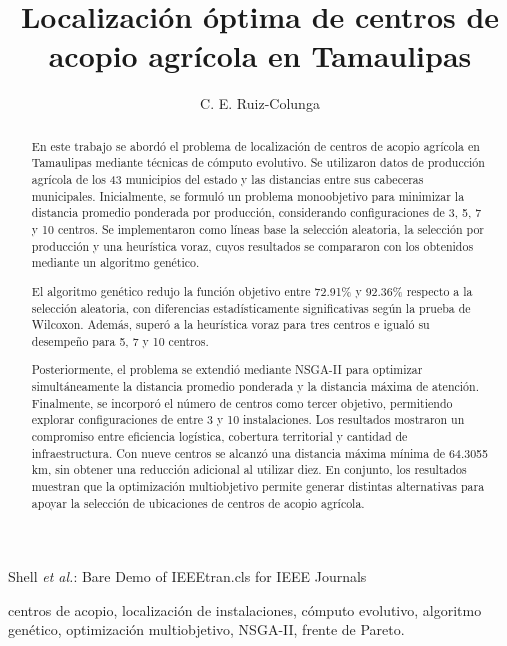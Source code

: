 \documentclass[journal]{IEEEtran}
\begin{document}
\title{Localización óptima de centros de acopio agrícola en Tamaulipas}

\author{C. E. Ruiz-Colunga}


%
{Shell \MakeLowercase{\textit{et al.}}: Bare Demo of IEEEtran.cls for IEEE Journals}

\maketitle

\begin{abstract}
En este trabajo se abordó el problema de localización de centros de acopio agrícola en Tamaulipas mediante técnicas de cómputo evolutivo. Se utilizaron datos de producción agrícola de los 43 municipios del estado y las distancias entre sus cabeceras municipales. Inicialmente, se formuló un problema monoobjetivo para minimizar la distancia promedio ponderada por producción, considerando configuraciones de 3, 5, 7 y 10 centros. Se implementaron como líneas base la selección aleatoria, la selección por producción y una heurística voraz, cuyos resultados se compararon con los obtenidos mediante un algoritmo genético.

El algoritmo genético redujo la función objetivo entre 72.91\% y 92.36\% respecto a la selección aleatoria, con diferencias estadísticamente significativas según la prueba de Wilcoxon. Además, superó a la heurística voraz para tres centros e igualó su desempeño para 5, 7 y 10 centros.

Posteriormente, el problema se extendió mediante NSGA-II para optimizar simultáneamente la distancia promedio ponderada y la distancia máxima de atención. Finalmente, se incorporó el número de centros como tercer objetivo, permitiendo explorar configuraciones de entre 3 y 10 instalaciones. Los resultados mostraron un compromiso entre eficiencia logística, cobertura territorial y cantidad de infraestructura. Con nueve centros se alcanzó una distancia máxima mínima de 64.3055 km, sin obtener una reducción adicional al utilizar diez. En conjunto, los resultados muestran que la optimización multiobjetivo permite generar distintas alternativas para apoyar la selección de ubicaciones de centros de acopio agrícola.
\end{abstract}

\begin{IEEEkeywords}
centros de acopio, localización de instalaciones, cómputo evolutivo, algoritmo genético, optimización multiobjetivo, NSGA-II, frente de Pareto.
\end{IEEEkeywords}
\end{document}
